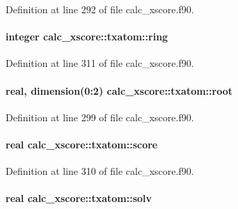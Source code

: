 Definition at line 292 of file calc\-\_\-xscore.\-f90.

\hypertarget{structcalc__xscore_1_1txatom_a084449ced0e3dd21760d771db5534e4a}{
\paragraph[{ring}]{\setlength{\rightskip}{0pt plus 5cm}integer calc\-\_\-xscore\-::txatom\-::ring}}\label{structcalc__xscore_1_1txatom_a084449ced0e3dd21760d771db5534e4a}


Definition at line 311 of file calc\-\_\-xscore.\-f90.

\hypertarget{structcalc__xscore_1_1txatom_ab4ac081f24d01657e4400a3969d6c90e}{
\paragraph[{root}]{\setlength{\rightskip}{0pt plus 5cm}real, dimension(0\-:2) calc\-\_\-xscore\-::txatom\-::root}}\label{structcalc__xscore_1_1txatom_ab4ac081f24d01657e4400a3969d6c90e}


Definition at line 299 of file calc\-\_\-xscore.\-f90.

\hypertarget{structcalc__xscore_1_1txatom_abf2d95af74459e9fcc4fa8d7a7b3120a}{
\paragraph[{score}]{\setlength{\rightskip}{0pt plus 5cm}real calc\-\_\-xscore\-::txatom\-::score}}\label{structcalc__xscore_1_1txatom_abf2d95af74459e9fcc4fa8d7a7b3120a}


Definition at line 310 of file calc\-\_\-xscore.\-f90.

\hypertarget{structcalc__xscore_1_1txatom_abb928a0fb1fbb6c4c5e3e73ac5cc8b32}{
\paragraph[{solv}]{\setlength{\rightskip}{0pt plus 5cm}real calc\-\_\-xscore\-::txatom\-::solv}}\label{structcalc__xscore_1_1txatom_abb928a0fb1fbb6c4c5e3e73ac5cc8b32}



